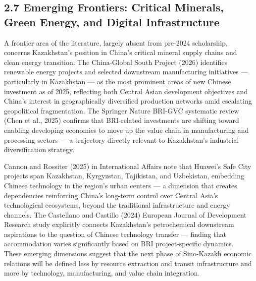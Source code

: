 \documentclass[12pt]{article}
\begin{document}
\subsection{2.7 Emerging Frontiers: Critical Minerals, Green Energy, and Digital Infrastructure}
A frontier area of the literature, largely absent from pre-2024 scholarship, concerns Kazakhstan's position in China's critical mineral supply chains and clean energy transition. The China-Global South Project (2026) identifies renewable energy projects and selected downstream manufacturing initiatives --- particularly in Kazakhstan --- as the most prominent areas of new Chinese investment as of 2025, reflecting both Central Asian development objectives and China's interest in geographically diversified production networks amid escalating geopolitical fragmentation. The Springer Nature BRI-GVC systematic review (Chen et al., 2025) confirms that BRI-related investments are shifting toward enabling developing economies to move up the value chain in manufacturing and processing sectors --- a trajectory directly relevant to Kazakhstan's industrial diversification strategy.\par
Cannon and Rossiter (2025) in International Affairs note that Huawei's Safe City projects span Kazakhstan, Kyrgyzstan, Tajikistan, and Uzbekistan, embedding Chinese technology in the region's urban centers --- a dimension that creates dependencies reinforcing China's long-term control over Central Asia's technological ecosystems, beyond the traditional infrastructure and energy channels. The Castellano and Castillo (2024) European Journal of Development Research study explicitly connects Kazakhstan's petrochemical downstream aspirations to the question of Chinese technology transfer --- finding that accommodation varies significantly based on BRI project-specific dynamics. These emerging dimensions suggest that the next phase of Sino-Kazakh economic relations will be defined less by resource extraction and transit infrastructure and more by technology, manufacturing, and value chain integration.\par
\end{document}
